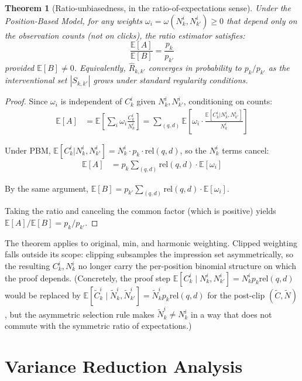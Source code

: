 \documentclass[sigconf]{acmart}
\newtheorem{theorem}{Theorem}
\begin{document}
\begin{theorem}[Ratio-unbiasedness, in the ratio-of-expectations sense]
\label{thm:ratio_unbiased}
Under the Position-Based Model, for any weights $\omega_i = \omega(N_k^i, N_{k'}^i) \geq 0$ that
depend only on the observation counts (not on clicks), the ratio estimator satisfies:
\[
\frac{\mathbb{E}[A]}{\mathbb{E}[B]} = \frac{p_k}{p_{k'}}
\]
provided $\mathbb{E}[B] \neq 0$. Equivalently, $\hat{R}_{k,k'}$ converges in probability to
$p_k/p_{k'}$ as the interventional set $|S_{k,k'}|$ grows under standard regularity conditions.
\end{theorem}

\begin{proof}
Since $\omega_i$ is independent of $C_k^i$ given $N_k^i, N_{k'}^i$, conditioning on counts:
\begin{align*}
\mathbb{E}[A] &= \mathbb{E}\left[\sum_i \omega_i \frac{C_k^i}{N_k^i}\right] = \sum_{(q,d)} \mathbb{E}\left[\omega_i \cdot \frac{\mathbb{E}[C_k^i | N_k^i, N_{k'}^i]}{N_k^i}\right]
\end{align*}

Under PBM, $\mathbb{E}[C_k^i | N_k^i, N_{k'}^i] = N_k^i \cdot p_k \cdot \textrm{rel}(q,d)$, so the $N_k^i$ terms cancel:
\begin{align*}
\mathbb{E}[A] &= p_k \sum_{(q,d)} \textrm{rel}(q,d) \cdot \mathbb{E}[\omega_i]
\end{align*}

By the same argument, $\mathbb{E}[B] = p_{k'} \sum_{(q,d)} \textrm{rel}(q,d) \cdot \mathbb{E}[\omega_i]$.

Taking the ratio and canceling the common factor (which is positive) yields $\mathbb{E}[A]/\mathbb{E}[B] = p_k/p_{k'}$.
\end{proof}

The theorem applies to original, min, and harmonic weighting. Clipped weighting falls outside
its scope: clipping subsamples the impression set asymmetrically, so the resulting $C_k^i, N_k^i$
no longer carry the per-position binomial structure on which the proof depends. (Concretely,
the proof step $\mathbb{E}[C_k^i \mid N_k^i, N_{k'}^i] = N_k^i p_k \mathrm{rel}(q,d)$ would be
replaced by $\mathbb{E}[\tilde C_k^i \mid \tilde N_k^i, \tilde N_{k'}^i] = \tilde N_k^i p_k
\mathrm{rel}(q,d)$ for the post-clip $(\tilde C, \tilde N)$, but the asymmetric selection rule
makes $\tilde N_k^i \neq N_k^i$ in a way that does not commute with the symmetric ratio of
expectations.)

\section{Variance Reduction Analysis}
\label{sec:variance_reduction}
\end{document}
